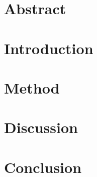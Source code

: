\documentclass[conference]{IEEEtran}
\begin{document}
	

	\section{Abstract}
	\label{sec:Abstract}

	\section{Introduction}
	\label{sec:Introduction}

	\section{Method}
	\label{sec:Method}

	\section{Discussion}
	\label{sec:Discussion}

	\section{Conclusion}
	\label{sec:Conclusion}

\end{document}
